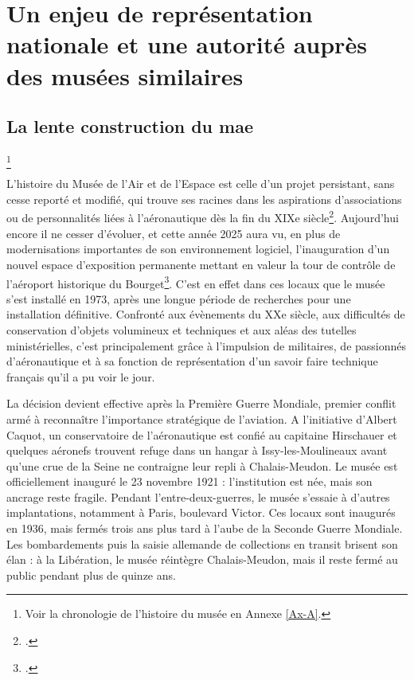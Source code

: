 \section{\label{I-A-1}Un enjeu de représentation nationale et une autorité auprès des musées similaires}

\subsection{La lente construction du \ac{mae}}\footnote{Voir la chronologie de l'histoire du musée en Annexe \ref{Ax-A}.}

L’histoire du Musée de l’Air et de l’Espace est celle d’un projet persistant, sans cesse reporté et modifié, qui trouve ses racines dans les aspirations d'associations ou de personnalités liées à l'aéronautique dès la fin du XIXe siècle\footcite{terrier_eroport_2019}. Aujourd'hui encore il ne cesser d'évoluer, et cette année 2025 aura vu, en plus de modernisations importantes de son environnement logiciel, l'inauguration d'un nouvel espace d'exposition permanente mettant en valeur la tour de contrôle de l'aéroport historique du Bourget\footcite{museedelairetdelespaceHallNavigationAerienne2025}. C'est en effet dans ces locaux que le musée s'est installé en 1973, après une longue période de recherches pour une installation définitive. Confronté aux évènements du XXe siècle, aux difficultés de conservation d'objets volumineux et techniques et aux aléas des tutelles ministérielles, c'est principalement grâce à l'impulsion de militaires, de passionnés d'aéronautique et à sa fonction de représentation d'un savoir faire technique français qu'il a pu voir le jour.

La décision devient effective après la Première Guerre Mondiale, premier conflit armé à reconnaître l'importance stratégique de l'aviation. A l'initiative d'Albert Caquot, un conservatoire de l'aéronautique est confié au capitaine Hirschauer et quelques aéronefs trouvent refuge dans un hangar à Issy-les-Moulineaux avant qu'une crue de la Seine ne contraigne leur repli à Chalais-Meudon. Le musée est officiellement inauguré le 23 novembre 1921 : l’institution est née, mais son ancrage reste fragile.
Pendant l’entre-deux-guerres, le musée s’essaie à d’autres implantations, notamment à Paris, boulevard Victor. Ces locaux sont inaugurés en 1936, mais fermés trois ans plus tard à l’aube de la Seconde Guerre Mondiale. Les bombardements puis la saisie allemande de collections en transit brisent son élan : à la Libération, le musée réintègre Chalais-Meudon, mais il reste fermé au public pendant plus de quinze ans.

